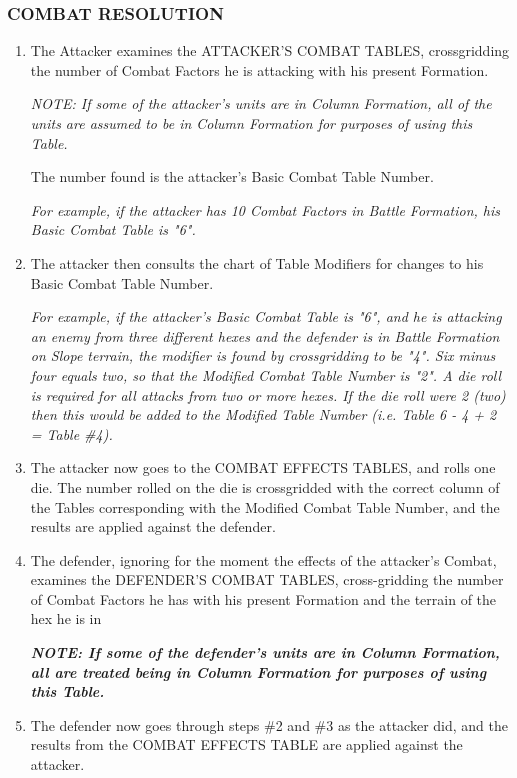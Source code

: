 \subsubsection{COMBAT RESOLUTION}

\begin{enumerate}
  \item The Attacker examines the ATTACKER'S COMBAT TABLES, crossgridding the number of Combat Factors he is attacking with his present Formation.

  \textit{NOTE: If some of the attacker's units are in Column Formation, all of the units are assumed to be in Column Formation for purposes of using this Table.}

  The number found is the attacker's Basic Combat Table Number.

  \textit{For example, if the attacker has 10 Combat Factors in Battle Formation, his Basic Combat Table is "6".}

  \item The attacker then consults the chart of Table Modifiers for changes to his Basic Combat Table Number.

  \textit{For example, if the attacker's Basic Combat Table is "6", and he is attacking an enemy from three different hexes and the defender is in Battle Formation on Slope terrain, the modifier is found by crossgridding to be "4". Six minus four equals two, so that the Modified Combat Table Number is "2". A die roll is required for all attacks from two or more hexes. If the die roll were 2 (two) then this would be added to the Modified Table Number (i.e. Table 6 - 4 + 2 = Table \#4).}

  \item The attacker now goes to the COMBAT EFFECTS TABLES, and rolls one die. The number rolled on the die is crossgridded with the correct column of the Tables corresponding with the Modified Combat Table Number, and the results are applied against the defender.

  \item The defender, ignoring for the moment the effects of the attacker's Combat, examines the DEFENDER'S COMBAT TABLES, cross-gridding the number of Combat Factors he has with his present Formation and the terrain of the hex he is in

  \textbf{\textit{NOTE: If some of the defender's units are in Column Formation, all are treated being in Column Formation for purposes of using this Table.}}

  \item The defender now goes through steps \#2 and \#3 as the attacker did, and the results from the COMBAT EFFECTS TABLE are applied against the attacker.


\end{enumerate}
